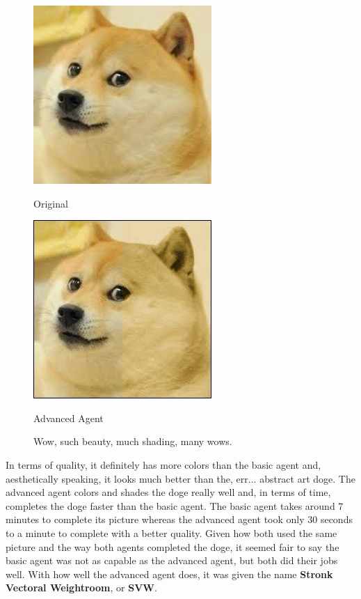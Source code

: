 \documentclass[11pt]{article}
\begin{document}
\begin{figure}[h]
\begin{minipage}[c]{0.5\textwidth}
\centering
\includegraphics[scale=0.94]{images/smolDoge.jpg}
\begin{center}
Original
\end{center}
\end{minipage}
\begin{minipage}[c]{0.5\textwidth}
\centering
\includegraphics[scale=0.70]{images/advanced.jpg}
\begin{center}
Advanced Agent
\end{center}
\end{minipage}
\caption{Wow, such beauty, much shading, many wows.}
\end{figure}

In terms of quality, it definitely has more colors than the basic agent and, aesthetically speaking, it looks much better than the, err... abstract art doge. The advanced agent colors and shades the doge really well and, in terms of time, completes the doge faster than the basic agent. The basic agent takes around 7 minutes to complete its picture whereas the advanced agent took only 30 seconds to a minute to complete with a better quality. Given how both used the same picture and the way both agents completed the doge, it seemed fair to say the basic agent was not as capable as the advanced agent, but both did their jobs well. With how well the advanced agent does, it was given the name \textbf{Stronk Vectoral Weightroom}, or \textbf{SVW}.
\end{document}
